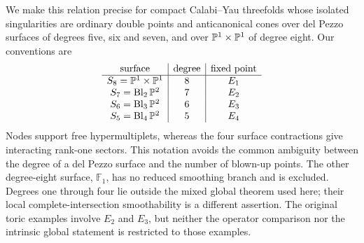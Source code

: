 We make this relation precise for compact Calabi--Yau threefolds whose isolated
singularities are ordinary double points and anticanonical cones over del
Pezzo surfaces of degrees five, six and seven, and over
$\mathbb P^1\times\mathbb P^1$ of degree eight. Our conventions are
\begin{equation}
 \begin{array}{c|c|c}
 \text{surface}&\text{degree}&\text{fixed point}\\\hline
 S_8=\mathbb P^1\times\mathbb P^1&8&E_1\\
 S_7=\operatorname{Bl}_2\mathbb P^2&7&E_2\\
 S_6=\operatorname{Bl}_3\mathbb P^2&6&E_3\\
 S_5=\operatorname{Bl}_4\mathbb P^2&5&E_4
 \end{array}
 \label{eq:intro-del-pezzo}
\end{equation}
Nodes support free hypermultiplets, whereas the four surface contractions
give interacting rank-one sectors. This notation avoids the common
ambiguity between the degree of a del Pezzo surface and the number of blown-up
points.
The other degree-eight surface, $\mathbb F_1$, has no reduced smoothing
branch and is excluded. Degrees one through four lie outside the mixed
global theorem used here; their local complete-intersection smoothability
is a different assertion. The original toric examples involve $E_2$ and
$E_3$, but neither the operator comparison nor the intrinsic global
statement is restricted to those examples.

